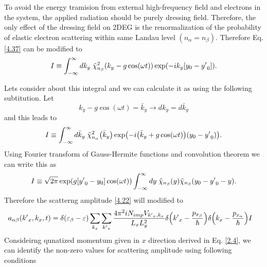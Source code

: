\noindent
To avoid the energy tramision from external high-frequency field and electrons in the system, the applied radiation should be purely dressing field. Therefore, the only effect of the dressing field on 2DEG is the renormalization of the probability of elastic electron scattering within same Landau level $(n_{\alpha} = n_{\beta})$. Therefore Eq. \eqref{4.37} can be modified to
\begin{equation} \label{4.38}
  \begin{aligned}
    I \equiv
    \int_{-\infty}^{\infty} dk_y \;
    \tilde{\chi}_{n_{\beta}}^2 \qty(k_y -g\cos(\omega t))
    \exp(
      -ik_y  \qty[y_0 - {y'}_0  ]
    ).
  \end{aligned}
\end{equation}

\noindent
Lets consider about this integral and we can calculate it as using the following subtitution. Let
\begin{equation} \label{4.39}
  {k}_y -g\cos(\omega t) = \bar{k}_y \longrightarrow d{k}_y = d\bar{k}_y
\end{equation}
and this leads to
\begin{equation} \label{4.40}
    I \equiv
    \int_{-\infty}^{\infty} d\bar{k}_y \;
    \tilde{\chi}_{n_{\alpha}}^2 \qty(\bar{k}_y)
    \exp(
      -i\qty(\bar{k}_y + g\cos(\omega t)) \qty(y_0 - {y'}_0)
    ).
\end{equation}
Using Fourier transform of Gauss-Hermite functions and convolution theorem we can write this as
\begin{equation} \label{4.41}
    I \equiv
    \sqrt{2\pi}
    \exp(g[{y'}_0 - y_0]\cos(\omega t))
    \int_{-\infty}^{\infty} dy \;
    \tilde{\chi}_{n_{\beta}}\qty(y)
    \tilde{\chi}_{n_{\beta}}\qty(y_0 - {y'}_0 - y).
\end{equation}
Therefore the scatterng amplitude \eqref{4.22} will modified to
\begin{equation} \label{4.42}
  \begin{aligned}
    a_{\alpha\beta}({k'}_x,k_x,t)  =
    \delta(\varepsilon_{\beta} - \varepsilon) &
    \sum_{k_x}\sum_{{k'}_x}
    \frac { 4\pi^2 i N_{imp} V_{{k'}_x,k_x}}{L_x L_y^2}
    \delta\qty({k'}_x -\frac{p_{x_{\beta}}}{\hbar})
    \delta\qty(k_x -\frac{p_{x_{\alpha}}}{\hbar})I
  \end{aligned}
\end{equation}
Consideirng qunatized momentum given in $x$ direction derived in Eq. \eqref{2.4}, we can identify the non-zero values for scattering amplitude using following conditions
